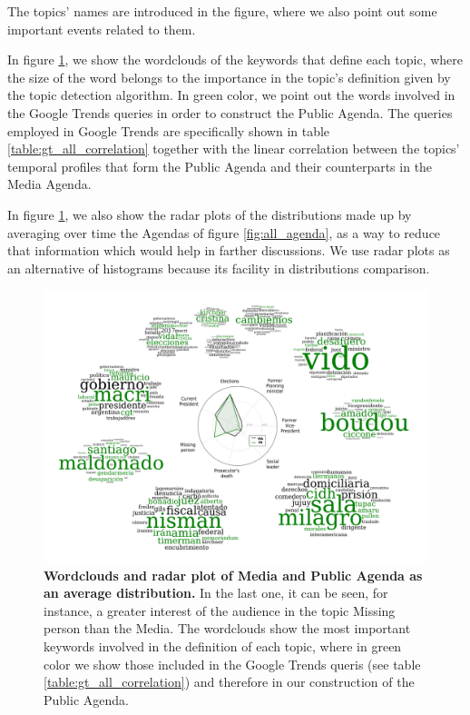 The topics' names are introduced in the figure, where we also point out some important events related to them.
\par In figure \ref{fig:topics_wordclouds}, we show the wordclouds of the keywords that define each topic, where the size of the word belongs to the importance in the topic's definition given by the topic detection algorithm. In green color, we point out the words involved in the Google Trends queries in order to construct the Public Agenda. The queries employed in Google Trends are specifically shown in table \ref{table:gt_all_correlation} together with the linear correlation between the topics' temporal profiles that form the Public Agenda and their counterparts in the Media Agenda.
\par In figure \ref{fig:topics_wordclouds}, we also show the radar plots of the distributions made up by averaging over time the Agendas of figure \ref{fig:all_agenda}, as a way to reduce that information which would help in farther discussions. We use radar plots as an alternative of histograms because its facility in distributions comparison.  

\begin{figure}[h]
\centering
\includegraphics[width = \textwidth]{images/Fig2.pdf}
\caption{\textbf{Wordclouds and radar plot of Media and Public Agenda as an average distribution.}
In the last one, it can be seen, for instance, a greater interest of the audience in the topic Missing person than the Media. 
The wordclouds show the most important keywords involved in the definition of each topic, where in green color we show those included in the Google Trends queris (see table \ref{table:gt_all_correlation}) and therefore in our construction of the Public Agenda.
}
\label{fig:topics_wordclouds}
\end{figure}

